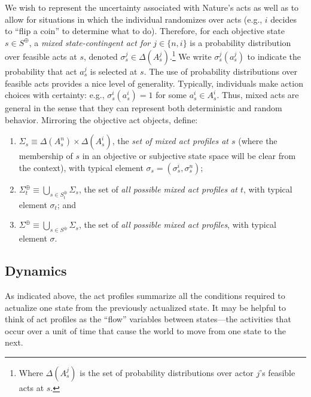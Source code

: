 \documentclass[
11pt,
titlepage,
reqno,
]{article}%
\theoremstyle{definition}
\begin{document}
 We wish to represent the uncertainty associated with Nature's acts as well as to allow for situations in which the individual randomizes over acts (e.g., $i$ decides to ``flip a coin'' to determine what to do).
 Therefore, for each objective state $s\in S^\oplus$, a \textit{mixed state-contingent act for $j\in\{n,i\}$} is a probability distribution over feasible acts at $s$, denoted $\sigma^j_s\in \Delta(A^j_{s})$.\footnote
 {
 	Where $\Delta(A^j_{s})$ is the set of probability distributions over actor $j$'s feasible acts at $s$. 
 } 
We write $\sigma^j_s(a^j_s)$ to indicate the probability that act $a^j_{s}$ is selected at $s$.
The use of probability distributions over feasible acts provides a nice level of generality.
Typically, individuals make action choices with certainty: e.g., $\sigma^i_s(a^i_s) =1$ for some $a^i_s\in A^i_s$.
Thus, mixed acts are general in the sense that they can represent both deterministic and random behavior.
Mirroring the objective act objects, define:
\begin{enumerate}
	\item $\Sigma_s\equiv \Delta(A^n_{s})\times\Delta(A^i_{s})$, the \textit{set of mixed act profiles at $s$} (where the membership of $s$ in an objective or subjective state space will be clear from the context), with typical element $\sigma_s=(\sigma^i_s,\sigma^n_s)$;
	\item $\Sigma^\oplus_t\equiv \bigcup_{s\in S^\oplus_t} \Sigma_s$, the set of \textit{all possible mixed act profiles at $t$}, with typical element $\sigma_t$; and
	\item $\Sigma^\oplus\equiv \bigcup_{s\in S^\oplus} \Sigma_s$, the set of \textit{all possible mixed act profiles}, with typical element $\sigma$.
\end{enumerate}

 
 
 
	
\subsection{Dynamics} 
	
As indicated above, the act profiles summarize all the conditions required to actualize one state from the previously actualized state. 	It may be helpful to think of act profiles as the ``flow'' variables between states---the activities that occur over a unit of time that cause the world to move from one state to the next.
	
\end{document}
